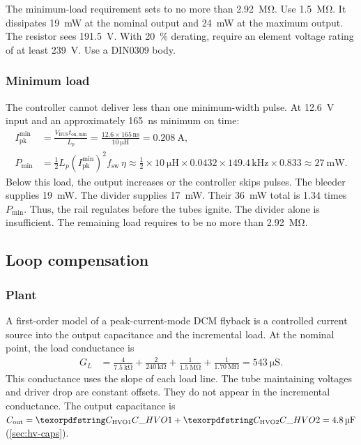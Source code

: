 The minimum-load requirement sets  to no more than
\SI{2.92}{\mega\ohm}. Use \SI{1.5}{\mega\ohm}. It dissipates
\SI{19}{\milli\watt} at the nominal output and \SI{24}{\milli\watt} at the
maximum output. The resistor sees \SI{191.5}{\volt}. With
\SI{20}{\percent} derating, require an element voltage rating of at least
\SI{239}{\volt}. Use a DIN0309 body.

\subsubsection{Minimum load}\label{sec:hv-bleeder-minload}

The controller cannot deliver less than one minimum-width pulse. At
\SI{12.6}{\volt} input and an approximately \SI{165}{\nano\second} minimum on
time:
\begin{align*}
  I_{\mathrm{pk}}^{\min} &= \frac{V_{\mathrm{BUS}} t_{\mathrm{on,min}}}{L_p}
    = \frac{12.6 \times 165\,\si{\nano\second}}{\SI{10}{\micro\henry}}
    = \SI{0.208}{\ampere},\\
  P_{\min} &= \tfrac{1}{2} L_p (I_{\mathrm{pk}}^{\min})^2 f_{\mathrm{sw}}\,\eta
    \approx \tfrac{1}{2}\times\SI{10}{\micro\henry}\times 0.0432 \times
      149.4\,\si{\kilo\hertz} \times 0.833
      \approx \SI{27}{\milli\watt}.
\end{align*}
Below this load, the output increases or the controller skips pulses. The
bleeder supplies \SI{19}{\milli\watt}. The divider supplies
\SI{17}{\milli\watt}. Their \SI{36}{\milli\watt} total is 1.34 times
$P_{\min}$. Thus, the rail regulates before the tubes ignite. The divider alone
is insufficient. The remaining load requires  to be no more
than \SI{2.92}{\mega\ohm}.

\subsection{Loop compensation}\label{sec:hv-comp}

\subsubsection{Plant}

A first-order model of a peak-current-mode DCM flyback is a controlled current
source into the output capacitance and the incremental load. At the nominal
point, the load conductance is
\begin{align*}
  G_L &= \frac{4}{\SI{7.5}{\kilo\ohm}}+
         \frac{2}{\SI{240}{\kilo\ohm}}+
         \frac{1}{\SI{1.5}{\mega\ohm}}+
         \frac{1}{\SI{1.70}{\mega\ohm}}
       = \SI{543}{\micro\siemens}.
\end{align*}
This conductance uses the slope of each load line. The tube maintaining voltages
and driver drop are constant offsets. They do not appear in the incremental
conductance. The output capacitance is $C_{\mathrm{out}} = \des{C}{HVO1} +
\des{C}{HVO2} = \SI{4.8}{\micro\farad}$ (\cref{sec:hv-caps}).

